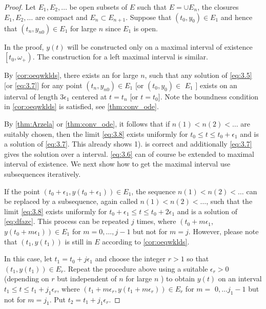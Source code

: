 \documentclass{article}
\begin{document}
\begin{proof}
Let $E_{1}, E_{2}, \ldots$ be open subsets of $E$ such that $E=\cup E_{n}$, the
closures $E_{1}, E_{2}, \ldots$ are compact and $E_{n} \subset E_{n+1} .$ Suppose that $\left(t_{0}, y_{0}\right) \in E_{1}$
and hence that $\left(t_{n}, y_{n 0}\right) \in E_{1}$ for large $n$ since $E_1$ is open.

In the proof, $y(t)$ will be constructed only on a  maximal interval of
existence $\left[t_{0}, \omega_{+}\right)$. The construction for a left maximal interval is similar.

By \cref{cor:oeqwklds}, there exists an  for large $n$, such
that any solution of \cref{eq:3.5} [or \cref{eq:3.7}] for any point $\left(t_{n}, y_{n 0}\right) \in E_{1}$ [or $\left(t_{0}, y_{0}\right) \in$
$E_{1}$ ] exists on an interval of length $3 \epsilon_{1}$ centered at $t=t_{n}$ [or $t=t_{0}$]. Note the boundness condition in \cref{cor:oeqwklds} is satisfied, see \cref{thm:conv_ode}.

By \cref{thm:Arzela} or \cref{thm:conv_ode}, it follows that if $n(1)<n(2)<\ldots$ are suitably chosen,
then the limit \cref{eq:3.8} exists uniformly for $t_{0} \le t \le t_{0}+\epsilon_{1}$ and is a solution of
\cref{eq:3.7}.  This already shows 1). is correct and additionally \cref{eq:3.7} gives the solution over a interval. \cref{eq:3.6} can of course be extended to maximal interval of existence. We next show how to get the maximal interval use subsequences iteratively. 

If the point $\left(t_{0}+\epsilon_{1}, y\left(t_{0}+\epsilon_{1}\right)\right) \in E_{1}$, the sequence $n(1)<n(2)<\ldots$
can be replaced by a subsequence, again called $n(1)<n(2)<\ldots$, such
that the limit \cref{eq:3.8} exists uniformly for $t_{0}+\epsilon_{1} \le t \le t_{0}+2 \epsilon_{1}$ and is a
solution of \cref{eq:dfazc}. This process can be repeated $j$ times, where $\left(t_{0}+m \epsilon_{1}\right.$,
$\left.y\left(t_{0}+m \epsilon_{1}\right)\right) \in E_{1}$ for $m=0, \ldots, j-1$ but not for $m=j .$ However, please note that  $\left(t_{1}, y\left(t_{1}\right)\right)$ is still in $E$ according to \cref{cor:oeqwklds}.

In this case, let $t_{1}=t_{0}+j \epsilon_{1}$ and choose the integer $r>1$ so that $\left(t_{1}, y\left(t_{1}\right)\right) \in E_{r}$. Repeat the procedure above using a suitable $\epsilon_{r}>0$ (depending on $r$ but independent of $n$ for large $n$ ) to obtain $y(t)$ on an interval $t_{1} \le t \le t_{1}+j_{1} \epsilon_{r}$, where $\left(t_{1}+m \epsilon_{r}, y\left(t_{1}+m \epsilon_{r}\right)\right) \in E_{r}$ for $m=$ $0, \ldots j_{1}-1$ but not for $m=j_{1}$. Put $t_{2}=t_{1}+j_{1} \epsilon_{r}$.


\end{proof}
\end{document}
